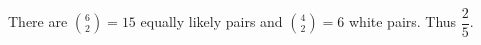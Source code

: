There are $\binom62=15 $ equally likely pairs and $\binom42=6 $ white pairs. Thus $\boxed{\dfrac{2}{5}}$.
